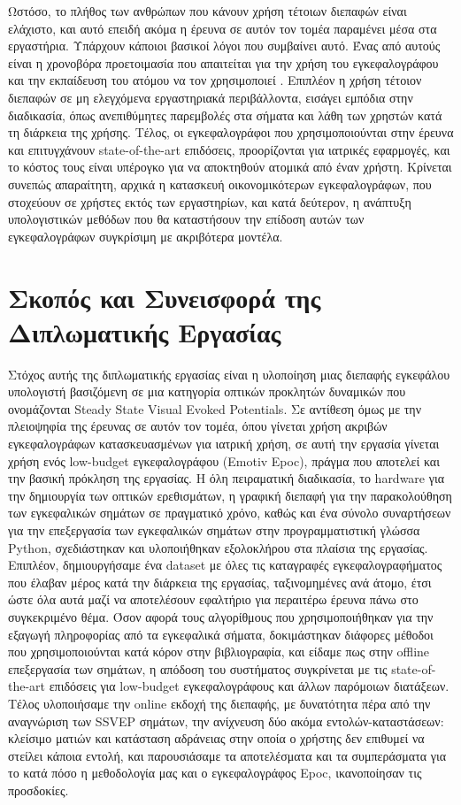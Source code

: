 \documentclass[11pt,a4paper,english,greek,twoside]{../Thesis}
\begin{document}
\par Ωστόσο, το πλήθος των ανθρώπων που κάνουν χρήση τέτοιων διεπαφών είναι ελάχιστο, και αυτό επειδή ακόμα η έρευνα σε αυτόν τον τομέα παραμένει μέσα στα εργαστήρια. Υπάρχουν κάποιοι βασικοί λόγοι που συμβαίνει αυτό. Ένας από αυτούς είναι η χρονοβόρα προετοιμασία που απαιτείται για την χρήση του εγκεφαλογράφου και την εκπαίδευση του ατόμου να τον χρησιμοποιεί \cite{blankertz2010berlin}. Επιπλέον η χρήση τέτοιον διεπαφών σε μη ελεγχόμενα εργαστηριακά περιβάλλοντα, εισάγει εμπόδια στην διαδικασία, όπως ανεπιθύμητες παρεμβολές στα σήματα και λάθη των χρηστών κατά τη διάρκεια της χρήσης. Τέλος, οι εγκεφαλογράφοι που χρησιμοποιούνται στην έρευνα και επιτυγχάνουν state-of-the-art επιδόσεις, προορίζονται για ιατρικές εφαρμογές, και το κόστος τους είναι υπέρογκο για να αποκτηθούν ατομικά από έναν χρήστη. Κρίνεται συνεπώς απαραίτητη, αρχικά η κατασκευή οικονομικότερων εγκεφαλογράφων, που στοχεύουν σε χρήστες εκτός των εργαστηρίων, και κατά δεύτερον, η ανάπτυξη υπολογιστικών μεθόδων που θα καταστήσουν την επίδοση αυτών των εγκεφαλογράφων συγκρίσιμη με ακριβότερα μοντέλα. 


\section{Σκοπός και Συνεισφορά της Διπλωματικής Εργασίας}
Στόχος αυτής της διπλωματικής εργασίας είναι η υλοποίηση μιας διεπαφής εγκεφάλου υπολογιστή βασιζόμενη σε μια κατηγορία οπτικών προκλητών δυναμικών που ονομάζονται Steady State Visual Evoked Potentials. Σε αντίθεση όμως με την πλειοψηφία της έρευνας σε αυτόν τον τομέα, όπου γίνεται χρήση ακριβών εγκεφαλογράφων κατασκευασμένων για ιατρική χρήση, σε αυτή την εργασία γίνεται χρήση ενός low-budget εγκεφαλογράφου (Emotiv Epoc), πράγμα που αποτελεί και την βασική πρόκληση της εργασίας. Η όλη πειραματική διαδικασία, το hardware για την δημιουργία των οπτικών ερεθισμάτων, η γραφική διεπαφή για την παρακολούθηση των εγκεφαλικών σημάτων σε πραγματικό χρόνο, καθώς και ένα σύνολο συναρτήσεων για την επεξεργασία των εγκεφαλικών σημάτων στην προγραμματιστική γλώσσα Python, σχεδιάστηκαν και υλοποιήθηκαν εξολοκλήρου στα πλαίσια της εργασίας. Επιπλέον, δημιουργήσαμε ένα dataset με όλες τις καταγραφές εγκεφαλογραφήματος που έλαβαν μέρος κατά την διάρκεια της εργασίας, ταξινομημένες ανά άτομο, έτσι ώστε όλα αυτά μαζί να αποτελέσουν εφαλτήριο για περαιτέρω έρευνα πάνω στο συγκεκριμένο θέμα. Όσον αφορά τους αλγορίθμους που χρησιμοποιήθηκαν για την εξαγωγή πληροφορίας από τα εγκεφαλικά σήματα, δοκιμάστηκαν διάφορες μέθοδοι που χρησιμοποιούνται κατά κόρον στην βιβλιογραφία, και είδαμε πως στην offline επεξεργασία των σημάτων, η απόδοση του συστήματος συγκρίνεται με τις state-of-the-art επιδόσεις για low-budget εγκεφαλογράφους και άλλων παρόμοιων διατάξεων. Τέλος υλοποιήσαμε την online εκδοχή της διεπαφής, με δυνατότητα πέρα από την αναγνώριση των SSVEP σημάτων, την ανίχνευση δύο ακόμα εντολών-καταστάσεων: κλείσιμο ματιών και κατάσταση αδράνειας στην οποία ο χρήστης δεν επιθυμεί να στείλει κάποια εντολή, και παρουσιάσαμε τα αποτελέσματα και τα συμπεράσματα για το κατά πόσο η μεθοδολογία μας και ο εγκεφαλογράφος Epoc, ικανοποίησαν τις προσδοκίες.
\end{document}
